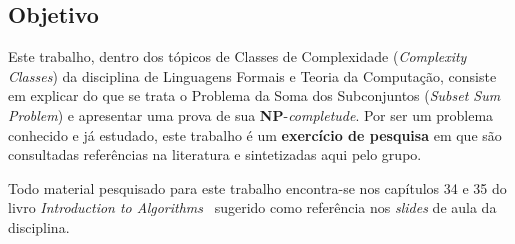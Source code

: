\subsection{Objetivo}

Este trabalho, dentro dos tópicos de Classes de Complexidade (\textit{Complexity Classes}) da disciplina de Linguagens Formais e Teoria da Computação, consiste em explicar do que se trata o Problema da Soma dos Subconjuntos (\textit{Subset Sum Problem}) e apresentar uma prova de sua \textbf{NP}-\textit{completude}. Por ser um problema conhecido e já estudado, este trabalho é um \textbf{exercício de pesquisa} em que são consultadas referências na literatura e sintetizadas aqui pelo grupo.

Todo material pesquisado para este trabalho encontra-se nos capítulos 34 e 35 do livro \textit{Introduction to Algorithms}~\cite{bib:cormen} sugerido como referência nos \textit{slides} de aula da disciplina.


